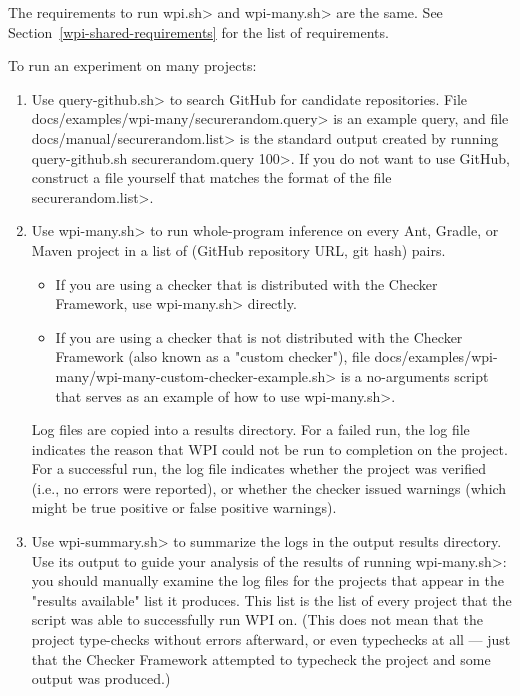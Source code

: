 
The requirements to run \<wpi.sh> and \<wpi-many.sh> are the same. See Section~\ref{wpi-shared-requirements}
for the list of requirements.

To run an experiment on many projects:
\begin{enumerate}
\item Use \<query-github.sh> to search GitHub for candidate repositories.
File \<docs/examples/wpi-many/securerandom.query> is an example query, and file
\<docs/manual/securerandom.list> is the standard output
created by running \<query-github.sh securerandom.query 100>. If you do
not want to use GitHub, construct a file yourself that matches the format of
the file \<securerandom.list>.

\item Use \<wpi-many.sh> to run whole-program inference on every
Ant, Gradle, or Maven project in a list of (GitHub repository URL, git hash)
pairs.
\begin{itemize}
\item If you are using a checker that is distributed with the Checker
Framework, use \<wpi-many.sh> directly.
\item If you are using a checker that is not distributed with the Checker
Framework (also known as a "custom checker"), file
\<docs/examples/wpi-many/wpi-many-custom-checker-example.sh> is a no-arguments
script that serves as an example of how to use \<wpi-many.sh>.
\end{itemize}

Log files are copied into a results directory.
For a failed run, the log file indicates the reason that WPI could not
be run to completion on the project.
For a successful run, the log file indicates whether the project was verified
(i.e., no errors were reported), or whether the checker issued warnings
(which might be true positive or false positive warnings).

\item Use \<wpi-summary.sh> to summarize the logs in the output results directory.
Use its output to guide your analysis of the results of running \<wpi-many.sh>:
you should manually examine the log files for the projects that appear in the
"results available" list it produces. This list is the list of every project
that the script was able to successfully run WPI on.  (This does not mean
that the project type-checks without errors afterward, or even typechecks at
all --- just that the Checker Framework attempted to typecheck the project and
some output was produced.)


\end{enumerate}
